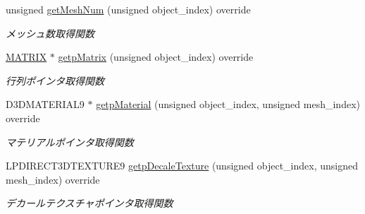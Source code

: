 \begin{DoxyCompactItemize}
unsigned \mbox{\hyperlink{class_stencil_shadow_test_draw_a285b3045ff5cc34b6b2b991cca434bb3}{get\+Mesh\+Num}} (unsigned object\+\_\+index) override
\begin{DoxyCompactList}\small\item\em メッシュ数取得関数 \end{DoxyCompactList}\item 
\mbox{\hyperlink{_vector3_d_8h_a032295cd9fb1b711757c90667278e744}{M\+A\+T\+R\+IX}} $\ast$ \mbox{\hyperlink{class_stencil_shadow_test_draw_a8ab105b75d673adc52698a8401c6525c}{getp\+Matrix}} (unsigned object\+\_\+index) override
\begin{DoxyCompactList}\small\item\em 行列ポインタ取得関数 \end{DoxyCompactList}\item 
D3\+D\+M\+A\+T\+E\+R\+I\+A\+L9 $\ast$ \mbox{\hyperlink{class_stencil_shadow_test_draw_aacdc680646f832451ea575f1da1eec9a}{getp\+Material}} (unsigned object\+\_\+index, unsigned mesh\+\_\+index) override
\begin{DoxyCompactList}\small\item\em マテリアルポインタ取得関数 \end{DoxyCompactList}\item 
L\+P\+D\+I\+R\+E\+C\+T3\+D\+T\+E\+X\+T\+U\+R\+E9 \mbox{\hyperlink{class_stencil_shadow_test_draw_a58f3699fa7ced20625edca807698aa85}{getp\+Decale\+Texture}} (unsigned object\+\_\+index, unsigned mesh\+\_\+index) override
\begin{DoxyCompactList}\small\item\em デカールテクスチャポインタ取得関数 \end{DoxyCompactList}\end{DoxyCompactItemize}
